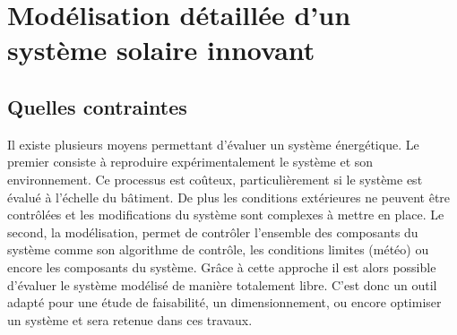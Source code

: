 
\section{Modélisation détaillée d’un système solaire innovant} %
\label{sec:modelisation_detaillee_d_un_systeme_solaire_innovant}
\subsection{Quelles contraintes} %
\label{sub:quelles_contraintes}
Il existe plusieurs moyens permettant d’évaluer un système énergétique. Le premier
consiste à reproduire expérimentalement le système et son environnement. Ce processus est
coûteux, particulièrement si le système est évalué à l’échelle du bâtiment. De plus les
conditions extérieures ne peuvent être contrôlées et les modifications du système sont complexes à mettre en place.
Le second, la modélisation, permet de contrôler l’ensemble des composants du système comme son
algorithme de contrôle, les conditions limites (météo) ou encore les composants du
système. Grâce à cette approche il est alors possible d’évaluer le système modélisé de
manière totalement libre. C’est donc un outil adapté pour une
étude de faisabilité, un dimensionnement, ou encore optimiser un système et sera retenue dans
ces travaux.

